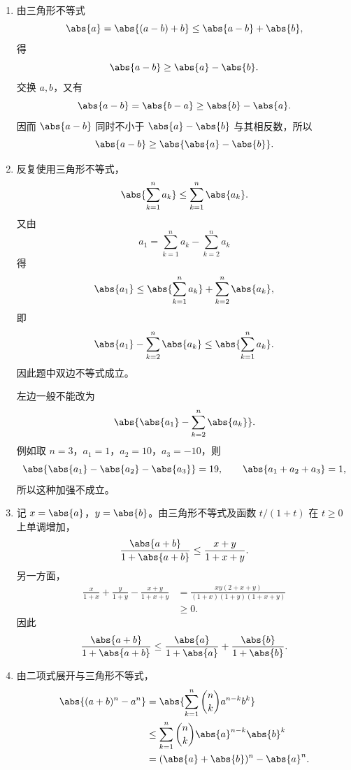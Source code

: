 \begin{xsolution}
\begin{enumerate}[label=(\arabic*)]
  \item 由三角形不等式
  \[
    \abs{a}=\abs{(a-b)+b}\le\abs{a-b}+\abs{b},
  \]
  得
  \[
    \abs{a-b}\ge\abs{a}-\abs{b}.
  \]
  交换 $a,b$，又有
  \[
    \abs{a-b}=\abs{b-a}\ge\abs{b}-\abs{a}.
  \]
  因而 $\abs{a-b}$ 同时不小于 $\abs{a}-\abs{b}$ 与其相反数，所以
  \[
    \abs{a-b}\ge\abs{\abs{a}-\abs{b}}.
  \]

  \item 反复使用三角形不等式，
  \[
    \abs{\sum_{k=1}^n a_k}\le\sum_{k=1}^n\abs{a_k}.
  \]
  又由
  \[
    a_1=\sum_{k=1}^n a_k-\sum_{k=2}^n a_k
  \]
  得
  \[
    \abs{a_1}
    \le\abs{\sum_{k=1}^n a_k}+\sum_{k=2}^n\abs{a_k},
  \]
  即
  \[
    \abs{a_1}-\sum_{k=2}^n\abs{a_k}
    \le\abs{\sum_{k=1}^n a_k}.
  \]
  因此题中双边不等式成立。

  左边一般不能改为
  \[
    \abs{\abs{a_1}-\sum_{k=2}^n\abs{a_k}}.
  \]
  例如取 $n=3$，$a_1=1$，$a_2=10$，$a_3=-10$，则
  \[
    \abs{\abs{a_1}-\abs{a_2}-\abs{a_3}}=19,
    \qquad
    \abs{a_1+a_2+a_3}=1,
  \]
  所以这种加强不成立。

  \item 记 $x=\abs{a}$，$y=\abs{b}$。由三角形不等式及函数 $t/(1+t)$ 在 $t\ge0$ 上单调增加，
  \[
    \frac{\abs{a+b}}{1+\abs{a+b}}
    \le\frac{x+y}{1+x+y}.
  \]
  另一方面，
  \[
  \begin{aligned}
    \frac{x}{1+x}+\frac{y}{1+y}-\frac{x+y}{1+x+y}
    &=\frac{xy(2+x+y)}{(1+x)(1+y)(1+x+y)}\\
    &\ge0.
  \end{aligned}
  \]
  因此
  \[
    \frac{\abs{a+b}}{1+\abs{a+b}}
    \le\frac{\abs{a}}{1+\abs{a}}+\frac{\abs{b}}{1+\abs{b}}.
  \]

  \item 由二项式展开与三角形不等式，
  \[
  \begin{aligned}
    \abs{(a+b)^n-a^n}
    &=\abs{\sum_{k=1}^n\binom{n}{k}a^{n-k}b^k}\\
    &\le\sum_{k=1}^n\binom{n}{k}\abs{a}^{n-k}\abs{b}^k\\
    &=(\abs{a}+\abs{b})^n-\abs{a}^n.
  \end{aligned}
  \]
\end{enumerate}
\end{xsolution}


